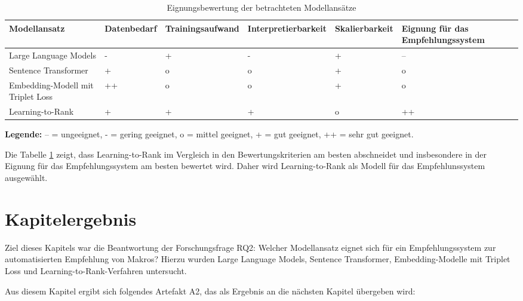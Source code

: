 \begin{table}[H] 
    \centering 
    \caption{Eignungsbewertung der betrachteten Modellansätze} 
    \label{tab:modellvergleich} 
    \renewcommand{\arraystretch}{1.25} \setlength{\tabcolsep}{4pt} 
    \begin{tabular}{ p{3.7cm} >{\centering\arraybackslash}p{1.8cm} >{\centering\arraybackslash}p{2.0cm} >{\centering\arraybackslash}p{2.2cm} >{\centering\arraybackslash}p{1.8cm} >{\centering\arraybackslash}p{2.6cm} } 
        \hline \textbf{Modellansatz} & \textbf{Datenbedarf} & \textbf{Trainings\-aufwand} & \textbf{Interpretier\-barkeit} & \textbf{Skalier\-barkeit} & \textbf{Eignung für das Empfehlungssystem} \\ 
        \hline Large Language Models & - & + & - & + & -- \\ Sentence Transformer & + & o & o & + & o \\ Embedding-Modell mit Triplet Loss & ++ & o & o & + & o \\ Learning-to-Rank & + & + & + & o & ++ \\ 
        \hline \end{tabular} \vspace{0.3cm} \begin{minipage}{0.94\textwidth} \footnotesize 
            \textbf{Legende:} -- = ungeeignet, - = gering geeignet, o = mittel geeignet, + = gut geeignet, ++ = sehr gut geeignet. 
         \end{minipage} 
        \end{table} 
        
Die Tabelle \ref{tab:modellvergleich} zeigt, dass Learning-to-Rank im Vergleich in den Bewertungskriterien am besten abschneidet und insbesondere in der Eignung für das Empfehlungssystem am besten bewertet wird. 
Daher wird Learning-to-Rank als Modell für das Empfehlunssystem ausgewählt.

\section{Kapitelergebnis} 

Ziel dieses Kapitels war die Beantwortung der Forschungsfrage RQ2: Welcher Modellansatz eignet sich für ein Empfehlungssystem zur automatisierten Empfehlung von Makros? 
Hierzu wurden Large Language Models, Sentence Transformer, Embedding-Modelle mit Triplet Loss und Learning-to-Rank-Verfahren untersucht. 


Aus diesem Kapitel ergibt sich folgendes Artefakt A2, das als Ergebnis an die nächsten Kapitel übergeben wird:

